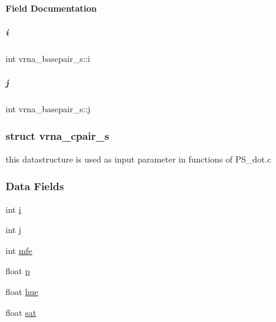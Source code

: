 \paragraph{Field Documentation}
\mbox{\label{group__data__structures_a82125b82685ad70eb6a30702a401eaa6}} 
\subparagraph{\texorpdfstring{i}{i}}
{\footnotesize\ttfamily int vrna\+\_\+basepair\+\_\+s\+::i}

\mbox{\label{group__data__structures_af4cfcd99d33a7bd331af05163261495a}} 
\subparagraph{\texorpdfstring{j}{j}}
{\footnotesize\ttfamily int vrna\+\_\+basepair\+\_\+s\+::j}

\label{structvrna__cpair__s}
\subsubsection{struct vrna\+\_\+cpair\+\_\+s}
this datastructure is used as input parameter in functions of P\+S\+\_\+dot.\+c \subsubsection*{Data Fields}
\begin{DoxyCompactItemize}
\item 
int \mbox{\hyperlink{group__data__structures_a2c3a7560376e8cf5caf5d978b59ecbc5}{i}}
\item 
int \mbox{\hyperlink{group__data__structures_a7dcb24ba978ed288002693416c920028}{j}}
\item 
int \mbox{\hyperlink{group__data__structures_a860b83ecd770e2e400e03c8042ab6dc4}{mfe}}
\item 
float \mbox{\hyperlink{group__data__structures_a315d7de8b08fb6b9d9c0cd749fb289fb}{p}}
\item 
float \mbox{\hyperlink{group__data__structures_af896ef199b072dd236fa053add3b5b7d}{hue}}
\item 
float \mbox{\hyperlink{group__data__structures_ab4aa029d10b7583c02f893ee22297f6f}{sat}}
\end{DoxyCompactItemize}


